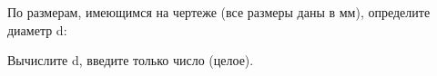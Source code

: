
По размерам, имеющимся на чертеже (все размеры даны в мм), определите диаметр d:


Вычислите d, введите только число (целое).


